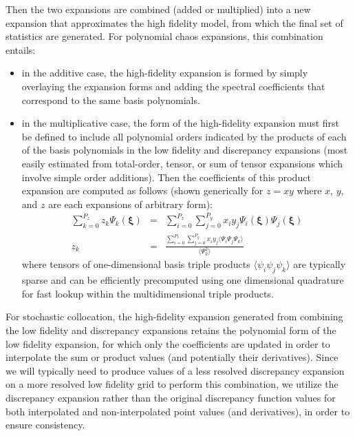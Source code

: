 Then the two expansions are combined (added or multiplied) into a new
expansion that approximates the high fidelity model, from which the
final set of statistics are generated.  For polynomial chaos
expansions, this combination entails:
\begin{itemize}
\item in the additive case, the high-fidelity expansion is formed by
  simply overlaying the expansion forms and adding the spectral
  coefficients that correspond to the same basis polynomials.
\item in the multiplicative case, the form of the high-fidelity
  expansion must first be defined to include all polynomial orders
  indicated by the products of each of the basis polynomials in the
  low fidelity and discrepancy expansions (most easily estimated from
  total-order, tensor, or sum of tensor expansions which involve
  simple order additions).  Then the coefficients of this product
  expansion are computed as follows (shown generically for $z = xy$
  where $x$, $y$, and $z$ are each expansions of arbitrary form):
\begin{eqnarray}
\sum_{k=0}^{P_z} z_k \Psi_k(\boldsymbol{\xi}) & = & \sum_{i=0}^{P_x} \sum_{j=0}^{P_y}
x_i y_j \Psi_i(\boldsymbol{\xi}) \Psi_j(\boldsymbol{\xi}) \\
z_k & = & \frac{\sum_{i=0}^{P_x} \sum_{j=0}^{P_y} x_i y_j 
\langle \Psi_i \Psi_j \Psi_k \rangle}{\langle \Psi^2_k \rangle}
\end{eqnarray}
  where tensors of one-dimensional basis triple products $\langle
  \psi_i \psi_j \psi_k \rangle$ are typically sparse and can be
  efficiently precomputed using one dimensional quadrature for fast
  lookup within the multidimensional triple products.
\end{itemize}
For stochastic collocation, the high-fidelity expansion generated from
combining the low fidelity and discrepancy expansions retains the
polynomial form of the low fidelity expansion, for which only the
coefficients are updated in order to interpolate the sum or product
values (and potentially their derivatives).  Since we will typically
need to produce values of a less resolved discrepancy expansion on a
more resolved low fidelity grid to perform this combination, we
utilize the discrepancy expansion rather than the original discrepancy
function values for both interpolated and non-interpolated point
values (and derivatives), in order to ensure consistency.

